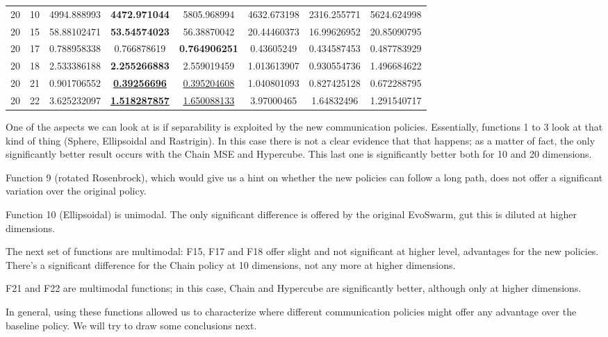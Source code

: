 \documentclass[runningheads]{llncs}
\begin{document}
\begin{table}[h!tb]
{\begin{tabular}{|c|c||c|c|c||c|c|c|}
20	&	10	&	4994.888993	&	\textbf{4472.971044}	&	5805.968994	&	4632.673198	&	2316.255771	&	5624.624998	\\
20	&	15	&	58.88102471	&	\textbf{53.54574023}	&	56.38870042	&	20.44460373	&	16.99626952	&	20.85090795	\\
20	&	17	&	0.788958338	&	0.766878619	&	\textbf{0.764906251}	&	0.43605249	&	0.434587453	&	0.487783929	\\
20	&	18	&	2.533386188	&	\textbf{2.255266883}	&	2.559019459	&	1.013613907	&	0.930554736	&	1.496684622	\\
20	&	21	&	0.901706552	&	\underline{\textbf{0.39256696}}	&	\underline{0.395204608}	&	1.040801093	&	0.827425128	&	0.672288795	\\
20	&	22	&	3.625232097	&	\underline{\textbf{1.518287857}}	&	\underline{1.650088133}	&	3.97000465	&	1.64832496	&	1.291540717	\\

    \hline
    \end{tabular}}
    \label{tab:my_label}
\end{table}
\hfill\break


One of the aspects we can look at is if separability is exploited by
the new communication policies. Essentially, functions 1 to 3
look at that kind of thing (Sphere, Ellipsoidal and Rastrigin). In
this case there is not a clear evidence that that happens; as a matter
of fact, the only significantly better result occurs with the Chain
MSE and Hypercube. This last one is significantly better both for 10
and 20 dimensions.

Function 9 (rotated Rosenbrock), which would give us a hint on whether
the new policies can follow a long path, does not offer a significant
variation over the original policy.

Function 10 (Ellipsoidal) is unimodal. The only significant difference
is offered by the original EvoSwarm, gut this is diluted at higher
dimensions.

The next set of functions are multimodal: F15, F17 and F18 offer
slight and not significant at higher level, advantages for the new
policies. There's a significant difference for the Chain policy at 10
dimensions, not any more at higher dimensions.

F21 and F22 are multimodal functions; in this case, Chain and
Hypercube are significantly better, although only at higher
dimensions.

In general, using these functions allowed us to characterize where
different communication policies might offer any advantage over the
baseline policy. We will try to draw some conclusions next.
\end{document}
